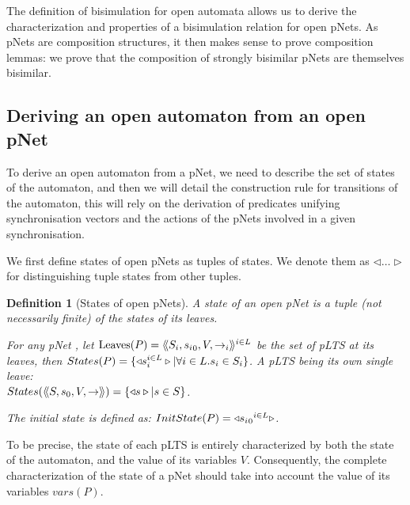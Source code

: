 \documentclass{lmcs}
\newcommand{\LUDO}[1]{\textcolor{darkgreen}{#1}}
\newtheorem{definition}{Definition}
\begin{document}
The definition of bisimulation for open automata allows us to derive the characterization and properties of a
bisimulation relation for open pNets. As pNets are composition
structures, it then makes sense to prove composition lemmas: we prove
that the composition of strongly bisimilar pNets are themselves
bisimilar. 

\subsection{Deriving an open automaton from an open pNet}
To derive an open automaton from a pNet, we need to describe the set of states of the automaton, and then we will detail the construction rule for transitions of the automaton, this will rely on the derivation of predicates unifying synchronisation vectors and the actions of the pNets involved in a given synchronisation.


We first define states of open pNets as tuples of states. We denote them
 as $\triangleleft\ldots\triangleright$ for distinguishing tuple 
states from other tuples.
\begin{definition}[States of open pNets]\label{def-states}
  A state of an open pNet is a tuple (not necessarily finite) of the
  states of its leaves.

  For any pNet \pNet, let $\operatorname{Leaves}(P) = \langle\hspace{-0.45ex}\langle S_i,{s_i}_0,V, \to_i\rangle\hspace{-0.45ex}\rangle^{i \in L}$ be 
  the set of pLTS at its leaves,
  then $States(P) = \{\triangleleft s_i^{i\in L}
  \triangleright| \forall i\in L. s_i \in S_i\}$.
A pLTS being its own single leave:\\
  $States(\langle\hspace{-0.45ex}\langle S,s_0,V, \to\rangle\hspace{-0.45ex}\rangle) = \{\triangleleft s \triangleright| s \in S \}$.  

The initial state is defined as:
$InitState(P) = \triangleleft {{s_i}_0}^{i\in L}  \triangleright$.
\end{definition}
To be precise, the state of each pLTS is entirely characterized by both the state of the automaton, and the value of its variables $V$. Consequently, the complete characterization of the state of a pNet should take into account the value of its variables $vars(P)$.
\end{document}
